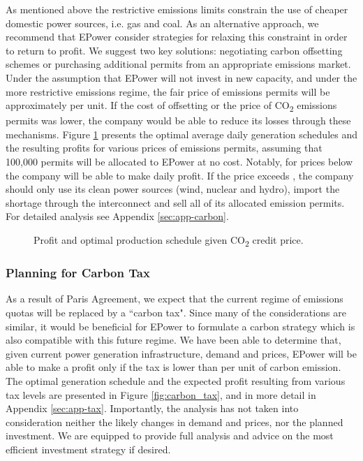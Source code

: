 \documentclass[twocolumn]{article}
\begin{document}
    As mentioned above the restrictive emissions limits constrain the use of cheaper domestic power sources, i.e. gas and coal. As an alternative approach, we recommend that EPower consider strategies for relaxing this constraint in order to return to profit.  We suggest two key solutions: negotiating carbon offsetting schemes or purchasing additional permits from an appropriate emissions market.  Under the assumption that EPower will not invest in new capacity, and under the more restrictive emissions regime, the fair price of emissions permits will be approximately  per unit. If the cost of offsetting or the price of CO\textsubscript{2} emissions permits was lower, the company would be able to reduce its losses through these mechanisms. Figure \ref{fig:carbon_credits} presents the optimal average daily generation schedules and the resulting profits for various prices of emissions permits, assuming that 100,000 permits will be allocated to EPower at no cost. Notably, for prices below  the company will be able to make daily profit. If the price exceeds , the company should only use its clean power sources (wind, nuclear and hydro), import the shortage through the interconnect and sell all of its allocated emission permits. For detailed analysis see Appendix \ref{sec:app-carbon}.
        
        \begin{figure}[!ht]
       		 \centering
            \caption{Profit and optimal production schedule given CO\textsubscript{2} credit price.\label{fig:carbon_credits}}
        \end{figure}
        
    
    \subsubsection{Planning for Carbon Tax}
    
    As a result of Paris Agreement, we expect that the current regime of emissions quotas will be replaced by a ``carbon tax".  Since many of the considerations are similar, it would be beneficial for EPower to formulate a carbon strategy which is also compatible with this future regime.  We have been able to determine that, given current power generation infrastructure, demand and prices, EPower will be able to make a profit only if the tax is lower than  per unit of carbon emission. The optimal generation schedule and the expected profit resulting from various tax levels are presented in Figure \ref{fig:carbon_tax}, and in more detail in Appendix \ref{sec:app-tax}. Importantly, the analysis has not taken into consideration neither the likely changes in demand and prices, nor the planned investment. We are equipped to provide full analysis and advice on the most efficient investment strategy if desired.
    
\end{document}
